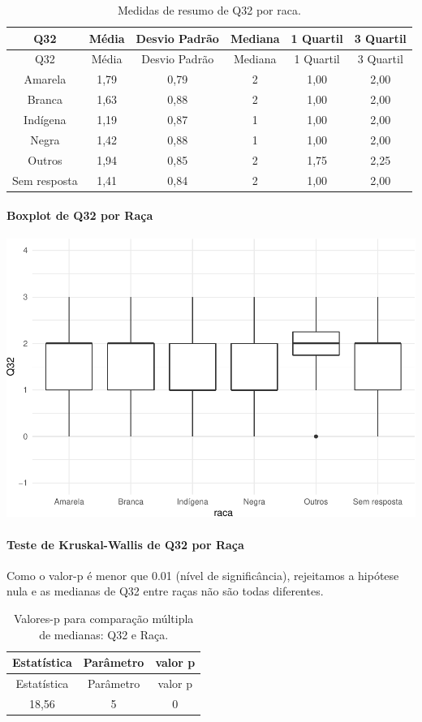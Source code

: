 \documentclass[]{article}
\let\oldparagraph\paragraph
\renewcommand{\paragraph}[1]{\oldparagraph{#1}\mbox{}}
\begin{document}
\begin{longtable}[]{@{}cccccc@{}}
\caption{\label{tab:unnamed-chunk-1108}Medidas de resumo de Q32 por raca.}\tabularnewline
\toprule
Q32 & Média & Desvio Padrão & Mediana & 1 Quartil & 3 Quartil\tabularnewline
\midrule
\endfirsthead
\toprule
Q32 & Média & Desvio Padrão & Mediana & 1 Quartil & 3 Quartil\tabularnewline
\midrule
\endhead
Amarela & 1,79 & 0,79 & 2 & 1,00 & 2,00\tabularnewline
Branca & 1,63 & 0,88 & 2 & 1,00 & 2,00\tabularnewline
Indígena & 1,19 & 0,87 & 1 & 1,00 & 2,00\tabularnewline
Negra & 1,42 & 0,88 & 1 & 1,00 & 2,00\tabularnewline
Outros & 1,94 & 0,85 & 2 & 1,75 & 2,25\tabularnewline
Sem resposta & 1,41 & 0,84 & 2 & 1,00 & 2,00\tabularnewline
\bottomrule
\end{longtable}

\hypertarget{boxplot-de-q32-por-rauxe7a}{%
\paragraph{Boxplot de Q32 por Raça}\label{boxplot-de-q32-por-rauxe7a}}

\begin{center}\includegraphics[width=0.75\linewidth]{relatorio_covid19_files/figure-latex/unnamed-chunk-1109-1} \end{center}

\hypertarget{teste-de-kruskal-wallis-de-q32-por-rauxe7a}{%
\paragraph{Teste de Kruskal-Wallis de Q32 por Raça}\label{teste-de-kruskal-wallis-de-q32-por-rauxe7a}}

Como o valor-p é menor que 0.01 (nível de significância), rejeitamos a hipótese nula e as medianas de Q32 entre raças não são todas diferentes.

\begin{longtable}[]{@{}ccc@{}}
\caption{\label{tab:unnamed-chunk-1111}Valores-p para comparação múltipla de medianas: Q32 e Raça.}\tabularnewline
\toprule
Estatística & Parâmetro & valor p\tabularnewline
\midrule
\endfirsthead
\toprule
Estatística & Parâmetro & valor p\tabularnewline
\midrule
\endhead
18,56 & 5 & 0\tabularnewline
\bottomrule
\end{longtable}
\end{document}
